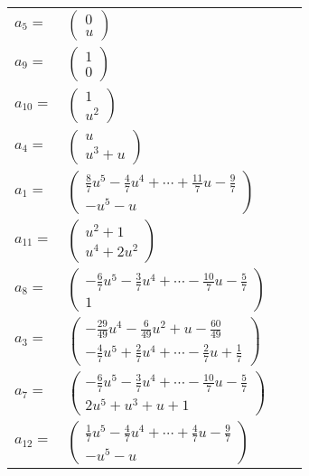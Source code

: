 \documentclass[1p]{elsarticle_modified}
\theoremstyle{definition}
\begin{document}
\begin{tabular}{m{7pt} m{180pt} m{7pt} m{180pt} }
\flushright $a_{5}=$&$\begin{pmatrix}0\\u\end{pmatrix}$ \\
\flushright $a_{9}=$&$\begin{pmatrix}1\\0\end{pmatrix}$ \\
\flushright $a_{10}=$&$\begin{pmatrix}1\\u^2\end{pmatrix}$ \\
\flushright $a_{4}=$&$\begin{pmatrix}u\\u^3+u\end{pmatrix}$ \\
\flushright $a_{1}=$&$\begin{pmatrix}\frac{8}{7} u^5-\frac{4}{7} u^4+\cdots+\frac{11}{7} u-\frac{9}{7}\\- u^5- u\end{pmatrix}$ \\
\flushright $a_{11}=$&$\begin{pmatrix}u^2+1\\u^4+2 u^2\end{pmatrix}$ \\
\flushright $a_{8}=$&$\begin{pmatrix}-\frac{6}{7} u^5-\frac{3}{7} u^4+\cdots-\frac{10}{7} u-\frac{5}{7}\\1\end{pmatrix}$ \\
\flushright $a_{3}=$&$\begin{pmatrix}-\frac{29}{49} u^4-\frac{6}{49} u^2+u-\frac{60}{49}\\-\frac{4}{7} u^5+\frac{2}{7} u^4+\cdots-\frac{2}{7} u+\frac{1}{7}\end{pmatrix}$ \\
\flushright $a_{7}=$&$\begin{pmatrix}-\frac{6}{7} u^5-\frac{3}{7} u^4+\cdots-\frac{10}{7} u-\frac{5}{7}\\2 u^5+u^3+u+1\end{pmatrix}$ \\
\flushright $a_{12}=$&$\begin{pmatrix}\frac{1}{7} u^5-\frac{4}{7} u^4+\cdots+\frac{4}{7} u-\frac{9}{7}\\- u^5- u\end{pmatrix}$ \\

\end{tabular}
\end{document}
